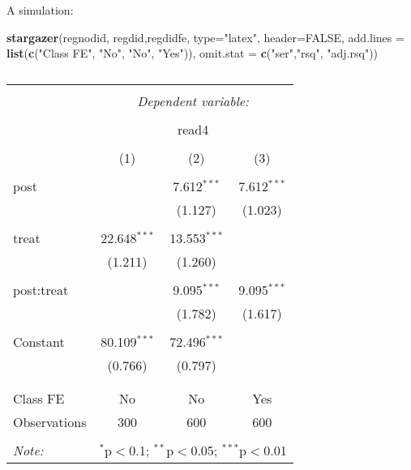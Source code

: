 \documentclass[
  ignorenonframetext,
]{beamer}
\newenvironment{Shaded}{\begin{snugshade}}{\end{snugshade}}
\newcommand{\DataTypeTok}[1]{\textcolor[rgb]{0.13,0.29,0.53}{#1}}
\newcommand{\KeywordTok}[1]{\textcolor[rgb]{0.13,0.29,0.53}{\textbf{#1}}}
\newcommand{\NormalTok}[1]{#1}
\newcommand{\OtherTok}[1]{\textcolor[rgb]{0.56,0.35,0.01}{#1}}
\newcommand{\StringTok}[1]{\textcolor[rgb]{0.31,0.60,0.02}{#1}}
\begin{document}
\begin{frame}[fragile]{A simulation:}
\protect\hypertarget{a-simulation-4}{}
\tiny

\begin{Shaded}
\begin{Highlighting}[]
\KeywordTok{stargazer}\NormalTok{(regnodid, regdid,regdidfe, }\DataTypeTok{type=}\StringTok{"latex"}\NormalTok{, }\DataTypeTok{header=}\OtherTok{FALSE}\NormalTok{, }
          \DataTypeTok{add.lines =} \KeywordTok{list}\NormalTok{(}\KeywordTok{c}\NormalTok{(}\StringTok{"Class FE"}\NormalTok{, }\StringTok{"No"}\NormalTok{, }\StringTok{"No"}\NormalTok{, }\StringTok{"Yes"}\NormalTok{)), }\DataTypeTok{omit.stat =} \KeywordTok{c}\NormalTok{(}\StringTok{"ser"}\NormalTok{,}\StringTok{"rsq"}\NormalTok{, }\StringTok{"adj.rsq"}\NormalTok{))}
\end{Highlighting}
\end{Shaded}

\begin{table}[!htbp] \centering 
  \caption{} 
  \label{} 
\begin{tabular}{@{\extracolsep{5pt}}lccc} 
\\[-1.8ex]\hline 
\hline \\[-1.8ex] 
 & \multicolumn{3}{c}{\textit{Dependent variable:}} \\ 
\cline{2-4} 
\\[-1.8ex] & \multicolumn{3}{c}{read4} \\ 
\\[-1.8ex] & (1) & (2) & (3)\\ 
\hline \\[-1.8ex] 
 post &  & 7.612$^{***}$ & 7.612$^{***}$ \\ 
  &  & (1.127) & (1.023) \\ 
  & & & \\ 
 treat & 22.648$^{***}$ & 13.553$^{***}$ &  \\ 
  & (1.211) & (1.260) &  \\ 
  & & & \\ 
 post:treat &  & 9.095$^{***}$ & 9.095$^{***}$ \\ 
  &  & (1.782) & (1.617) \\ 
  & & & \\ 
 Constant & 80.109$^{***}$ & 72.496$^{***}$ &  \\ 
  & (0.766) & (0.797) &  \\ 
  & & & \\ 
\hline \\[-1.8ex] 
Class FE & No & No & Yes \\ 
Observations & 300 & 600 & 600 \\ 
\hline 
\hline \\[-1.8ex] 
\textit{Note:}  & \multicolumn{3}{r}{$^{*}$p$<$0.1; $^{**}$p$<$0.05; $^{***}$p$<$0.01} \\ 
\end{tabular} 
\end{table}
\end{frame}
\end{document}
